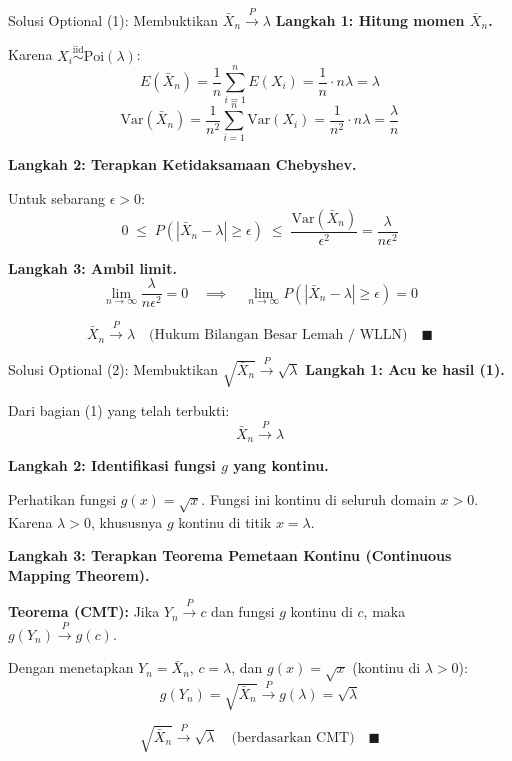 \documentclass[10pt,twoside]{article}
\begin{document}
\begin{solbox}{Solusi Optional (1): Membuktikan $\bar{X}_n \xrightarrow{P} \lambda$}
\textbf{Langkah 1: Hitung momen $\bar{X}_n$.}

Karena $X_i \overset{\mathrm{iid}}{\sim} \mathrm{Poi}(\lambda)$:
\[
E(\bar{X}_n) = \frac{1}{n}\sum_{i=1}^n E(X_i) = \frac{1}{n} \cdot n\lambda = \lambda
\]
\[
\mathrm{Var}(\bar{X}_n) = \frac{1}{n^2}\sum_{i=1}^n \mathrm{Var}(X_i) = \frac{1}{n^2} \cdot n\lambda = \frac{\lambda}{n}
\]

\textbf{Langkah 2: Terapkan Ketidaksamaan Chebyshev.}

Untuk sebarang $\epsilon > 0$:
\[
0 \;\le\; P\!\left(|\bar{X}_n - \lambda| \ge \epsilon\right) \;\le\; \frac{\mathrm{Var}(\bar{X}_n)}{\epsilon^2} = \frac{\lambda}{n\epsilon^2}
\]

\textbf{Langkah 3: Ambil limit.}
\[
\lim_{n \to \infty} \frac{\lambda}{n\epsilon^2} = 0 \quad \implies \quad \lim_{n \to \infty} P(|\bar{X}_n - \lambda| \ge \epsilon) = 0
\]

\[
\boxed{\bar{X}_n \xrightarrow{P} \lambda \quad \text{(Hukum Bilangan Besar Lemah / WLLN)}} \quad \blacksquare
\]
\end{solbox}

\begin{solbox}{Solusi Optional (2): Membuktikan $\sqrt{\bar{X}_n} \xrightarrow{P} \sqrt{\lambda}$}
\textbf{Langkah 1: Acu ke hasil (1).}

Dari bagian (1) yang telah terbukti:
\[
\bar{X}_n \xrightarrow{P} \lambda
\]

\textbf{Langkah 2: Identifikasi fungsi $g$ yang kontinu.}

Perhatikan fungsi $g(x) = \sqrt{x}$. Fungsi ini kontinu di seluruh domain $x > 0$. Karena $\lambda > 0$, khususnya $g$ kontinu di titik $x = \lambda$.

\textbf{Langkah 3: Terapkan Teorema Pemetaan Kontinu (Continuous Mapping Theorem).}

\textbf{Teorema (CMT):} Jika $Y_n \xrightarrow{P} c$ dan fungsi $g$ kontinu di $c$, maka $g(Y_n) \xrightarrow{P} g(c)$.

Dengan menetapkan $Y_n = \bar{X}_n$, $c = \lambda$, dan $g(x) = \sqrt{x}$ (kontinu di $\lambda > 0$):
\[
g(Y_n) = \sqrt{\bar{X}_n} \xrightarrow{P} g(\lambda) = \sqrt{\lambda}
\]

\[
\boxed{\sqrt{\bar{X}_n} \xrightarrow{P} \sqrt{\lambda} \quad \text{(berdasarkan CMT)}} \quad \blacksquare
\]
\end{solbox}
\end{document}
